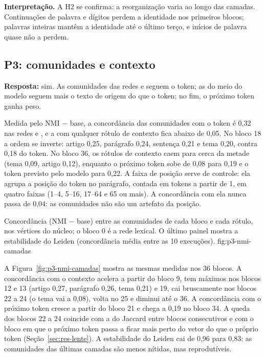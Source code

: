 \textbf{Interpretação.} A H2 se confirma: a reorganização varia ao longo das camadas.
Continuações de palavra e dígitos perdem a identidade nos primeiros blocos; palavras inteiras
mantêm a identidade até o último terço, e inícios de palavra quase não a perdem.

\subsection{P3: comunidades e contexto}\label{sec:res-p3}

\textbf{Resposta:} sim. As comunidades das redes  e  seguem o token; as do
meio do modelo seguem mais o texto de origem do que o token; no fim, o próximo token ganha peso.

Medida pelo NMI $-$ base, a concordância das comunidades com o token é 0,32 nas redes 
e , e a com qualquer rótulo de contexto fica abaixo de 0,05. No bloco 18 a ordem se
inverte: artigo 0,25, parágrafo 0,24, sentença 0,21 e tema 0,20, contra 0,18 do token. No bloco
36, os rótulos de contexto caem para cerca da metade (tema 0,09, artigo 0,12), enquanto o
próximo token sobe de 0,08 para 0,19 e o token previsto pelo modelo para 0,22. A faixa de
posição serve de controle: ela agrupa a posição do token no parágrafo, contada em tokens a
partir de 1, em quatro faixas (1--4, 5--16, 17--64 e 65 ou mais). A concordância com ela nunca
passa de 0,04: as comunidades não são um artefato da posição.

    {Concordância (NMI $-$ base) entre as comunidades de cada bloco e cada rótulo, nos
    vértices do núcleo; o bloco 0 é a rede lexical. O último painel mostra a estabilidade do
    Leiden (concordância média entre as 10 execuções).}
    {fig:p3-nmi-camadas}

A Figura~\ref{fig:p3-nmi-camadas} mostra as mesmas medidas nos 36 blocos. A concordância com o
contexto acelera a partir do bloco 9, tem máximos nos blocos 12 e 13 (artigo 0,27, parágrafo
0,26, tema 0,21) e 19, cai bruscamente nos blocos 22 a 24 (o tema vai a 0,08), volta no 25 e
diminui até o 36. A concordância com o próximo token cresce a partir do bloco 21 e chega a 0,19
no bloco 34. A queda dos blocos 22 a 24 coincide com a do Jaccard entre blocos consecutivos e
com o bloco em que o próximo token passa a ficar mais perto do vetor do que o próprio token
(Seção~\ref{sec:res-lente}). A estabilidade do Leiden cai de 0,96 para 0,83: as comunidades das
últimas camadas são menos nítidas, mas reprodutíveis.

